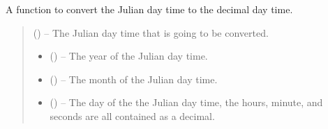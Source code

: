 \documentclass[letterpaper,11pt,english]{sphinxmanual}
\begin{document}

\begin{savenotes}\begin{fulllineitems}
\label{\detokenize{code/opihiexarata.library.conversion:opihiexarata.library.conversion.julian_day_to_decimal_day}}
\pysigstartsignatures
{}
\pysigstopsignatures
\sphinxAtStartPar
A function to convert the Julian day time to the decimal day time.
\begin{quote}\begin{description}
\sphinxAtStartPar
{} () – The Julian day time that is going to be converted.

\sphinxAtStartPar
\begin{itemize}
\item {} 
\sphinxAtStartPar
{} () – The year of the Julian day time.

\item {} 
\sphinxAtStartPar
{} () – The month of the Julian day time.

\item {} 
\sphinxAtStartPar
{} () – The day of the the Julian day time, the hours, minute, and seconds are all
contained as a decimal.

\end{itemize}


\end{description}\end{quote}

\end{fulllineitems}\end{savenotes}

\end{document}
